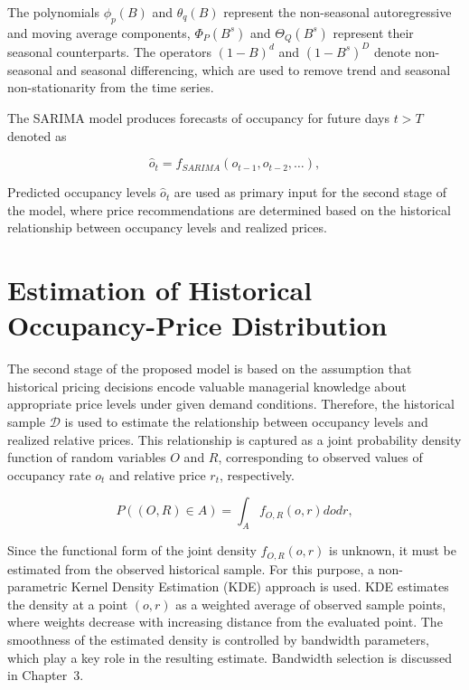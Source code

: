 The polynomials $\phi_p(B)$ and $\theta_q(B)$ represent the non-seasonal autoregressive and moving average components, $\Phi_P(B^s)$ and $\Theta_Q(B^s)$ represent their seasonal counterparts. The operators $(1-B)^d$ and $(1-B^s)^D$ denote non-seasonal and seasonal differencing, which are used to remove trend and seasonal non-stationarity from the time series.

The SARIMA model produces forecasts of occupancy for future days $t>T$ denoted as

\begin{equation}
    \hat{o}_t = f_{SARIMA}(o_{t-1}, o_{t-2}, \ldots),
\end{equation}

Predicted occupancy levels $\hat{o}_t$ are used as primary input for the second stage of the model, where price recommendations are determined based on the historical relationship between occupancy levels and realized prices.


\section{Estimation of Historical Occupancy-Price Distribution}
The second stage of the proposed model is based on the assumption that historical pricing decisions encode valuable managerial knowledge about appropriate price levels under given demand conditions. Therefore, the historical sample $\mathcal D$ is used to estimate the relationship between occupancy levels and realized relative prices. This relationship is captured as a joint probability density function of random variables $O$ and $R$, corresponding to observed values of occupancy rate $o_t$ and relative price $r_t$, respectively.

\begin{equation}
    P((O,R) \in A) = \int_A f_{O,R}(o,r) do dr,
\end{equation}

Since the functional form of the joint density $f_{O,R}(o,r)$ is unknown, it must be estimated from the observed historical sample. For this purpose, a non-parametric Kernel Density Estimation (KDE) approach is used. KDE estimates the density at a point $(o,r)$ as a weighted average of observed sample points, where weights decrease with increasing distance from the evaluated point. The smoothness of the estimated density is controlled by bandwidth parameters, which play a key role in the resulting estimate. Bandwidth selection is discussed in Chapter~3.

